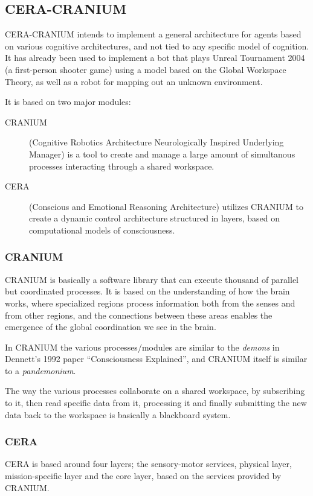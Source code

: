 \subsection{CERA-CRANIUM}
CERA-CRANIUM intends to implement a general architecture for agents based on
various cognitive architectures, and not tied to any specific model of
cognition. It has already been used to implement a bot that plays Unreal
Tournament 2004 (a first-person shooter game) using a model based on the Global
Workspace Theory, as well as a robot for mapping out an unknown environment.
\cite{Arrabales2009}

It is based on two major modules:
\begin{description}
 \item [CRANIUM] (Cognitive Robotics Architecture Neurologically Inspired
Underlying Manager) is a tool to create and manage a large amount of
simultanous processes interacting through a shared workspace.
 \item [CERA] (Conscious and Emotional Reasoning Architecture)
 utilizes CRANIUM to create a dynamic control architecture structured in
layers, based on computational models of consciousness.
\end{description}

\subsubsection{CRANIUM}
CRANIUM is basically a software library that can execute thousand of parallel
but coordinated processes.
It is based on the understanding of how the brain works, where specialized
regions process information both from the senses and from other regions, and
the connections between these areas enables the emergence of the global
coordination we see in the brain.\cite{baars2005gwd}

In CRANIUM the various processes/modules are similar to the \textit{demons} in
Dennett's 1992 paper ``Consciousness Explained'', and CRANIUM itself is similar
to a \textit{pandemonium}\cite{dennet1992consciousness}.

The way the various processes collaborate on a shared workspace, by subscribing
to it, then read specific data from it, processing it and finally submitting the
new data back to the workspace is basically a blackboard
system.\cite{nii1986blackboard}

\subsubsection{CERA}
CERA is based around four layers; the sensory-motor services, physical layer,
mission-specific layer and the core layer, based on the services provided by
CRANIUM.

